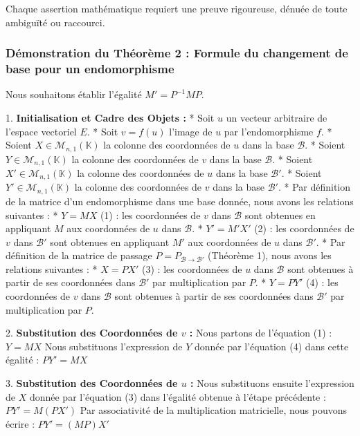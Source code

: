 \documentclass{report}
\begin{document}
Chaque assertion mathématique requiert une preuve rigoureuse, dénuée de toute ambiguïté ou raccourci.

\subsubsection*{Démonstration du Théorème 2 : Formule du changement de base pour un endomorphisme}

Nous souhaitons établir l'égalité $M' = P^{-1} M P$.

1.  \textbf{Initialisation et Cadre des Objets :}
    *   Soit $u$ un vecteur arbitraire de l'espace vectoriel $E$.
    *   Soit $v = f(u)$ l'image de $u$ par l'endomorphisme $f$.
    *   Soient $X \in \mathcal{M}_{n,1}(\mathbb{K})$ la colonne des coordonnées de $u$ dans la base $\mathcal{B}$.
    *   Soient $Y \in \mathcal{M}_{n,1}(\mathbb{K})$ la colonne des coordonnées de $v$ dans la base $\mathcal{B}$.
    *   Soient $X' \in \mathcal{M}_{n,1}(\mathbb{K})$ la colonne des coordonnées de $u$ dans la base $\mathcal{B}'$.
    *   Soient $Y' \in \mathcal{M}_{n,1}(\mathbb{K})$ la colonne des coordonnées de $v$ dans la base $\mathcal{B}'$.
    *   Par définition de la matrice d'un endomorphisme dans une base donnée, nous avons les relations suivantes :
        *   $Y = M X$ (1) : les coordonnées de $v$ dans $\mathcal{B}$ sont obtenues en appliquant $M$ aux coordonnées de $u$ dans $\mathcal{B}$.
        *   $Y' = M' X'$ (2) : les coordonnées de $v$ dans $\mathcal{B}'$ sont obtenues en appliquant $M'$ aux coordonnées de $u$ dans $\mathcal{B}'$.
    *   Par définition de la matrice de passage $P = P_{\mathcal{B} \to \mathcal{B}'}$ (Théorème 1), nous avons les relations suivantes :
        *   $X = P X'$ (3) : les coordonnées de $u$ dans $\mathcal{B}$ sont obtenues à partir de ses coordonnées dans $\mathcal{B}'$ par multiplication par $P$.
        *   $Y = P Y'$ (4) : les coordonnées de $v$ dans $\mathcal{B}$ sont obtenues à partir de ses coordonnées dans $\mathcal{B}'$ par multiplication par $P$.

2.  \textbf{Substitution des Coordonnées de $v$ :}
    Nous partons de l'équation (1) :
    $Y = M X$
    Nous substituons l'expression de $Y$ donnée par l'équation (4) dans cette égalité :
    $P Y' = M X$

3.  \textbf{Substitution des Coordonnées de $u$ :}
    Nous substituons ensuite l'expression de $X$ donnée par l'équation (3) dans l'égalité obtenue à l'étape précédente :
    $P Y' = M (P X')$
    Par associativité de la multiplication matricielle, nous pouvons écrire :
    $P Y' = (M P) X'$
\end{document}
